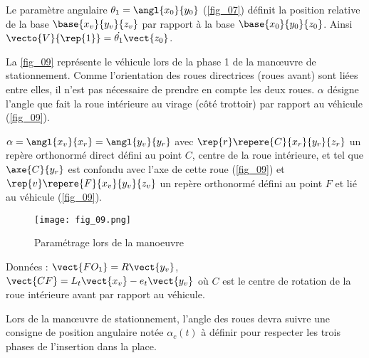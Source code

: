 Le paramètre angulaire $\theta_1 = \angl{x_0}{y_0}$ (\autoref{fig_07}) définit la position relative de la base $\base{x_v}{y_v}{z_v}$
par rapport à la base $\base{x_0}{y_0}{z_0}$. Ainsi $\vecto{V}{\rep{1}} = \dot{\theta_1}\vect{z_0}$.

La \autoref{fig_09} représente le véhicule lors de la phase 1 de la manœuvre de stationnement. Comme l’orientation des
roues directrices (roues avant) sont liées entre elles, il n’est pas nécessaire de prendre en compte les deux roues.
$\alpha$ désigne l’angle que fait la roue intérieure au virage (côté trottoir) par rapport au véhicule (\autoref{fig_09}).

 $\alpha = \angl{x_v}{x_r}=\angl{y_v}{y_r}$
 avec $\rep{r} \repere{C}{x_r}{y_r}{z_r}$ 
un repère orthonormé direct défini au point $C$, centre de la roue intérieure, et tel que $\axe{C}{y_r}$ est confondu avec l’axe de cette roue (\autoref{fig_09}) et $\rep{v}\repere{F}{x_v}{y_v}{z_v}$ un repère
orthonormé défini au point $F$ et lié au véhicule (\autoref{fig_09}).


\begin{figure}[H]
\centering
\texttt{[image: fig\_09.png]}
\caption{Paramétrage lors de la manoeuvre \label{fig_09}}
\end{figure}

Données : $\vect{FO_1}=R\vect{y_v}$, $\vect{CF}=L_t\vect{x_v}-e_t\vect{y_v}$ où $C$ est le centre de rotation de la roue intérieure avant par rapport au véhicule.

\ifprof
\begin{corrige}
\end{corrige}
\else
\fi

\ifprof
\begin{corrige}
\end{corrige}
\else
\fi

Lors de la manœuvre de stationnement, l’angle des roues devra suivre une consigne de position angulaire notée $\alpha_c(t)$ à définir pour respecter les trois phases de l’insertion dans la place.

